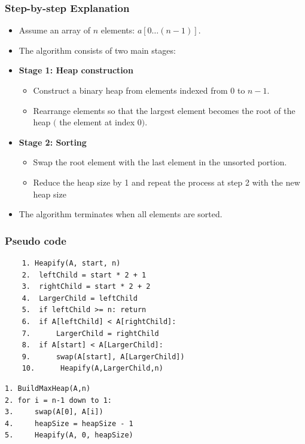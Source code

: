 \subsubsection{Step-by-step Explanation}
\begin{itemize}
    \item Assume an array of $n$ elements: $a[0 \dots (n-1)]$.
    \item The algorithm consists of two main stages:
    
    \item \textbf{Stage 1: Heap construction}
    \begin{itemize}
        \item Construct a binary heap from elements indexed from $0$ to $n-1$.
        \item Rearrange elements so that the largest element becomes the root of the heap $($ the element at index 0$ )$.
    \end{itemize}

    \item \textbf{Stage 2: Sorting}
    \begin{itemize}
        \item Swap the root element with the last element in the unsorted portion.
        \item Reduce the heap size by 1 and repeat the process at step 2 with the new heap size
    \end{itemize}

    \item The algorithm terminates when all elements are sorted.
\end{itemize}

\subsubsection{Pseudo code}

\begin{verbatim}
    1. Heapify(A, start, n)
    2.  leftChild = start * 2 + 1
    3.  rightChild = start * 2 + 2
    4.  LargerChild = leftChild
    5.  if leftChild >= n: return
    6.  if A[leftChild] < A[rightChild]:
    7.      LargerChild = rightChild
    8.  if A[start] < A[LargerChild]:
    9.      swap(A[start], A[LargerChild])
    10.      Heapify(A,LargerChild,n) 
\end{verbatim}

\begin{verbatim}
1. BuildMaxHeap(A,n)
2. for i = n-1 down to 1:
3.     swap(A[0], A[i])
4.     heapSize = heapSize - 1
5.     Heapify(A, 0, heapSize)
\end{verbatim}



